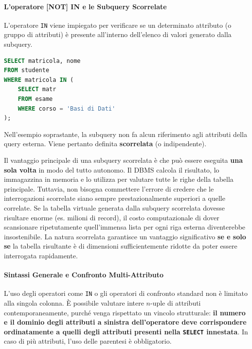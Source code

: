 \paragraph{L'operatore [NOT] IN e le Subquery Scorrelate}

L'operatore \texttt{IN} viene impiegato per verificare se un determinato attributo (o gruppo di attributi) è presente all'interno dell'elenco di valori generato dalla subquery.

\medskip

\begin{example}
\begin{lstlisting}[language=SQL, basicstyle=\ttfamily\small, keywordstyle=\color{blue}\bfseries]
SELECT matricola, nome
FROM studente
WHERE matricola IN (
    SELECT matr
    FROM esame
    WHERE corso = 'Basi di Dati'
);
\end{lstlisting}
\end{example}

\begin{warningbox}
Nell'esempio soprastante, la subquery non fa alcun riferimento agli attributi della query esterna. Viene pertanto definita \textbf{scorrelata} (o indipendente).

Il vantaggio principale di una subquery scorrelata è che può essere eseguita \textbf{una sola volta} in modo del tutto autonomo. Il DBMS calcola il risultato, lo immagazzina in memoria e lo utilizza per valutare tutte le righe della tabella principale. 
Tuttavia, non bisogna commettere l'errore di credere che le interrogazioni scorrelate siano sempre prestazionalmente superiori a quelle correlate. Se la tabella virtuale generata dalla subquery scorrelata dovesse risultare enorme (es. milioni di record), il costo computazionale di dover scansionare ripetutamente quell'immensa lista per ogni riga esterna diventerebbe insostenibile. La natura scorrelata garantisce un vantaggio significativo \textbf{se e solo se} la tabella risultante è di dimensioni sufficientemente ridotte da poter essere interrogata rapidamente.
\end{warningbox}

\paragraph{Sintassi Generale e Confronto Multi-Attributo}

L'uso degli operatori come \texttt{IN} o gli operatori di confronto standard non è limitato alla singola colonna. È possibile valutare intere $n$-uple di attributi contemporaneamente, purché venga rispettato un vincolo strutturale: \textbf{il numero e il dominio degli attributi a sinistra dell'operatore deve corrispondere ordinatamente a quelli degli attributi presenti nella \texttt{SELECT} innestata}. In caso di più attributi, l'uso delle parentesi è obbligatorio. 

